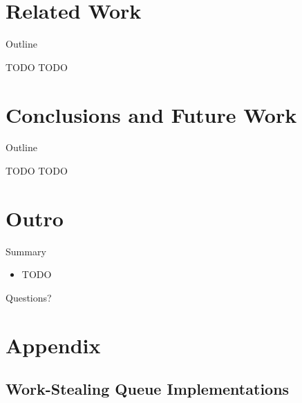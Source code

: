 \note{
}


\section{Related Work}

\begin{frame}{Outline}
  \tableofcontents[current]
\end{frame}

\note{
}

\begin{frame}{TODO}
  TODO
\end{frame}

\note{
}


\section{Conclusions and Future Work}

\begin{frame}{Outline}
  \tableofcontents[current]
\end{frame}

\note{
}

\begin{frame}{TODO}
  TODO
\end{frame}

\note{
}


\section*{Outro}

\begin{frame}{Summary}
  \begin{itemize}
  \item TODO
  \end{itemize}
\end{frame}

\note{
}

\begin{frame}
  \begin{center}
    \huge Questions?
  \end{center}
\end{frame}

\note{
}


\appendix

\section{Appendix}

\subsection{Work-Stealing Queue Implementations}

